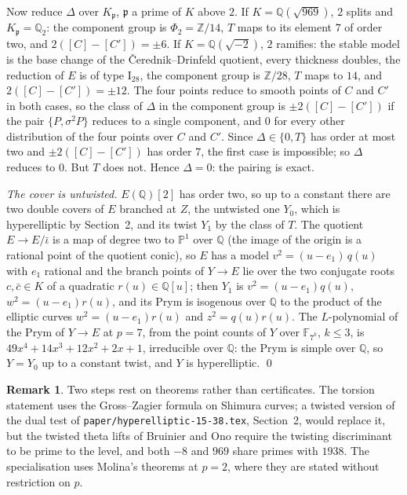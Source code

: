 \documentclass[11pt,reqno]{amsart}
\theoremstyle{plain}
\theoremstyle{definition}
\newtheorem{remark}[theorem]{Remark}
\newcommand{\Q}{\mathbb{Q}}
\newcommand{\Z}{\mathbb{Z}}
\newcommand{\F}{\mathbb{F}}
\begin{document}
Now reduce $\Delta$ over $K_{\mathfrak p}$, $\mathfrak p$ a prime of $K$ above $2$. If $K=\Q(\sqrt{969})$,
$2$ splits and $K_{\mathfrak p}=\Q_2$: the component group is $\Phi_2=\Z/14$, $T$ maps to its element $7$ of
order two, and $2([C]-[C'])=\pm6$. If $K=\Q(\sqrt{-2})$, $2$ ramifies: the stable model is the base change of
the \v{C}erednik--Drinfeld quotient, every thickness doubles, the reduction of $E$ is of type
$\mathrm{I}_{28}$, the component group is $\Z/28$, $T$ maps to $14$, and $2([C]-[C'])=\pm12$. The four points
reduce to smooth points of $C$ and $C'$ in both cases, so the class of $\Delta$ in the component group is
$\pm2([C]-[C'])$ if the pair $\{P,\sigma^2P\}$ reduces to a single component, and $0$ for every other
distribution of the four points over $C$ and $C'$. Since $\Delta\in\{0,T\}$ has order at most two and
$\pm2([C]-[C'])$ has order $7$, the first case is impossible; so $\Delta$ reduces to $0$. But $T$ does not.
Hence $\Delta=0$: the pairing is exact.

\emph{The cover is untwisted.} $E(\Q)[2]$ has order two, so up to a constant there are two double covers of
$E$ branched at $Z$, the untwisted one $Y_0$, which is hyperelliptic by Section~2, and its twist $Y_1$ by the
class of $T$. The quotient $E\to E/\bar\iota$ is a map of degree two to $\mathbb P^1$ over $\Q$ (the image of
the origin is a rational point of the quotient conic), so $E$ has a model $v^2=(u-e_1)\,q(u)$ with $e_1$
rational and the branch points of $Y\to E$ lie over the two conjugate roots $c,\bar c\in K$ of a quadratic
$r(u)\in\Q[u]$; then $Y_1$ is $v^2=(u-e_1)q(u)$, $w^2=(u-e_1)r(u)$, and its Prym is isogenous over $\Q$ to the
product of the elliptic curves $w^2=(u-e_1)r(u)$ and $z^2=q(u)r(u)$. The $L$-polynomial of the Prym of
$Y\to E$ at $p=7$, from the point counts of $Y$ over $\F_{7^k}$, $k\le3$, is $49x^4+14x^3+12x^2+2x+1$,
irreducible over $\Q$: the Prym is simple over $\Q$, so $Y=Y_0$ up to a constant twist, and $Y$ is
hyperelliptic. \qed

\begin{remark}
Two steps rest on theorems rather than certificates. The torsion statement uses the Gross--Zagier formula on
Shimura curves; a twisted version of the dual test of \texttt{paper/hyperelliptic-15-38.tex}, Section~2, would
replace it, but the twisted theta lifts of Bruinier and Ono require the twisting discriminant to be prime to
the level, and both $-8$ and $969$ share primes with $1938$. The specialisation uses Molina's theorems at
$p=2$, where they are stated without restriction on $p$.
\end{remark}
\end{document}
